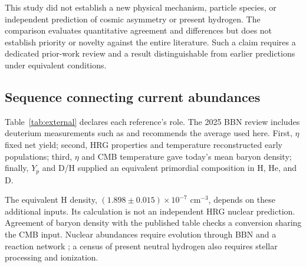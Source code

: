 This study did not establish a new physical mechanism, particle species, or independent prediction of cosmic asymmetry or present hydrogen. The comparison evaluates quantitative agreement and differences but does not establish priority or novelty against the entire literature. Such a claim requires a dedicated prior-work review and a result distinguishable from earlier predictions under equivalent conditions.

\subsection{Sequence connecting current abundances}
Table~\ref{tab:external} declares each reference's role. The 2025 BBN review includes deuterium measurements such as \citet{Cooke2018} and recommends the average used here. First, $\eta$ fixed net yield; second, HRG properties and temperature reconstructed early populations; third, $\eta$ and CMB temperature gave today's mean baryon density; finally, $Y_p$ and D/H supplied an equivalent primordial composition in H, He, and D.

The equivalent H density, $(1.898\pm0.015)\times10^{-7}$ cm$^{-3}$, depends on these additional inputs. Its calculation is not an independent HRG nuclear prediction. Agreement of baryon density with the published table checks a conversion sharing the CMB input. Nuclear abundances require evolution through BBN and a reaction network \citep{Fields2025}; a census of present neutral hydrogen also requires stellar processing and ionization.

